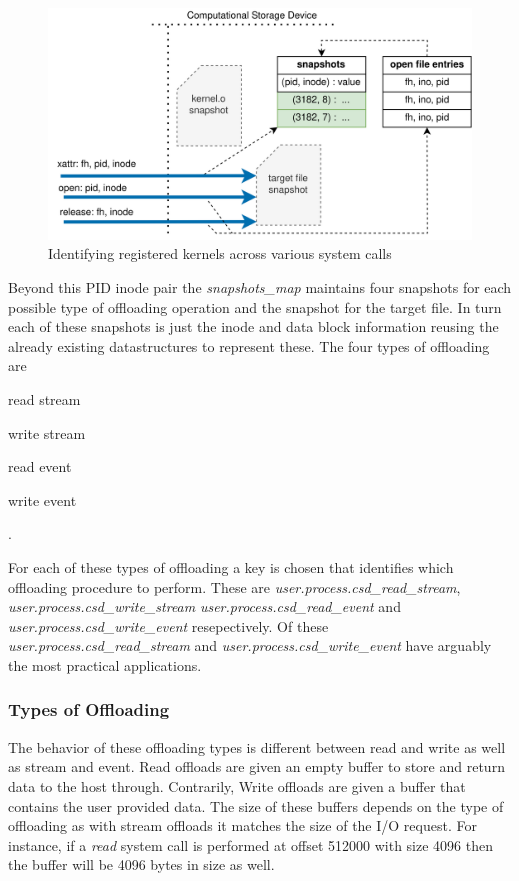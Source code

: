 \begin{figure}
    \centering
	\includegraphics[width=1\textwidth]{resources/images/offloading-management.png}
	\caption{Identifying registered kernels across various system calls}
    \label{figure:offloadingmanagement}
\end{figure}

Beyond this PID inode pair the \textit{snapshots\_map} maintains four snapshots
for each possible type of offloading operation and the snapshot for the target
file. In turn each of these snapshots is just the inode and data block
information reusing the already existing datastructures to represent these.
The four types of offloading are \begin{enumerate*} \item read stream
\item write stream \item read event \item write event \end{enumerate*}.

For each of these types of offloading a key is chosen that identifies which
offloading procedure to perform. These are
\textit{user.process.csd\_read\_stream},
\textit{user.process.csd\_write\_stream} \textit{user.process.csd\_read\_event}
and \textit{user.process.csd\_write\_event} resepectively. Of these
\textit{user.process.csd\_read\_stream} and
\textit{user.process.csd\_write\_event} have arguably the most practical 
applications.

\subsubsection{Types of Offloading}

The behavior of these offloading types is different between read and write as
well as stream and event. Read offloads are given an empty buffer to store and
return data to the host through. Contrarily, Write offloads are given a buffer
that contains the user provided data. The size of these buffers depends on the
type of offloading as with stream offloads it matches the size of the I/O
request. For instance, if a \textit{read} system call is performed at offset
512000 with size 4096 then the buffer will be 4096 bytes in size as well.

